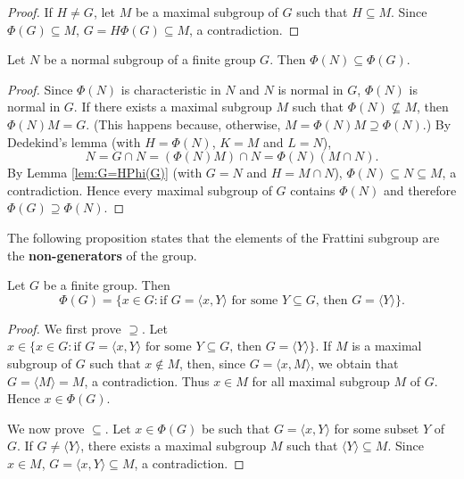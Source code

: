 \begin{proof}
If $H\ne G$, let $M$ be a maximal subgroup of $G$ such that 
$H\subseteq M$. Since $\Phi(G)\subseteq M$, $G=H\Phi(G)\subseteq M$, a 
contradiction. 
\end{proof}

\begin{proposition}
\label{pro:phi(N)phi(G)}
Let $N$ be a normal subgroup of a finite group $G$. Then 
$\Phi(N)\subseteq\Phi(G)$.
\end{proposition}

\begin{proof}
Since $\Phi(N)$ is characteristic in $N$ and $N$ 
is normal in $G$, $\Phi(N)$ is normal in $G$. 
If there exists a maximal subgroup $M$ such that 
$\Phi(N)\not\subseteq M$, then $\Phi(N)M=G$. (This happens
because, otherwise, $M=\Phi(N)M\supseteq\Phi(N)$.) By Dedekind's lemma (with  $H=\Phi(N)$, $K=M$ and $L=N$), 
\[
N=G\cap N=(\Phi(N)M)\cap N=\Phi(N)(M\cap N).
\]
By Lemma \ref{lem:G=HPhi(G)} (with $G=N$ and $H=M\cap N$), 
$\Phi(N)\subseteq N\subseteq M$, a contradiction. 
Hence every maximal subgroup of $G$ contains $\Phi(N)$ and therefore 
$\Phi(G)\supseteq\Phi(N)$. 
\end{proof}

The following proposition states that the 
elements of the Frattini subgroup are the \textbf{non-generators} of 
the group. 

\begin{proposition}
	\label{pro:nongenerators}
	Let $G$ be a finite group. Then 
 	\[
	\Phi(G)=\{x\in G:\text{if $G=\langle x,Y\rangle$ for some $Y\subseteq G$, then $G=\langle Y\rangle$}\}.
	\]
\end{proposition}

\begin{proof}
We first prove $\supseteq$. Let $x\in \{x\in G:\text{if $G=\langle x,Y\rangle$ for some $Y\subseteq G$, then $G=\langle Y\rangle$}\}$. If $M$ is a maximal subgroup of $G$ such that $x\not\in M$, then, since $G=\langle
	x,M\rangle$, we obtain that $G=\langle M\rangle=M$, a contradiction. Thus $x\in M$ for all maximal subgroup $M$ of $G$. Hence 
 $x\in \Phi(G)$. 

We now prove $\subseteq$. Let $x\in\Phi(G)$ be such that $G=\langle
	x,Y\rangle$ for some subset $Y$ of $G$. If $G\ne \langle Y\rangle$,
	there exists a maximal subgroup $M$ such that $\langle Y\rangle\subseteq M$. Since
	$x\in M$, $G=\langle x,Y\rangle\subseteq M$, a contradiction. 
\end{proof}


